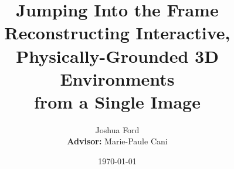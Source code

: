 \documentclass[11pt,a4paper]{article}
\title{\textbf{Jumping Into the Frame}\\[0.4em]
\large Reconstructing Interactive, Physically-Grounded 3D Environments\\
from a Single Image}
\author{Joshua Ford \\
\textbf{Advisor:} Marie-Paule Cani}
\date{\today}
\begin{document}
\maketitle















{\small

}
\end{document}
